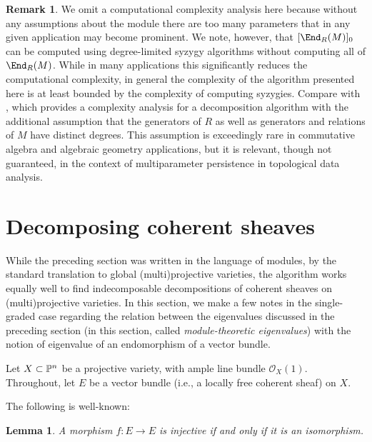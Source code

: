 \documentclass[12pt]{article}
\def\OO{\mathcal O}
\theoremstyle{theorem}
\numberwithin{thm}{section}
\newtheorem{lem}[thm]{Lemma}
\theoremstyle{definition}
\newtheorem{rem}[thm]{Remark}
\begin{document}
\begin{rem}
  We omit a computational complexity analysis here because without any assumptions about the module there are too many parameters that in any given application may become prominent. We note, however, that $[\End_R(M)]_0$ can be computed using degree-limited syzygy algorithms without computing all of $\End_R(M)$. While in many applications this significantly reduces the computational complexity, in general the complexity of the algorithm presented here is at least bounded by the complexity of computing syzygies. Compare with \cite{DX22}, which provides a complexity analysis for a decomposition algorithm with the additional assumption that the generators of $R$ as well as generators and relations of $M$ have distinct degrees. This assumption is exceedingly rare in commutative algebra and algebraic geometry applications, but it is relevant, though not guaranteed, in the context of multiparameter persistence in topological data analysis.
\end{rem}

\section{Decomposing coherent sheaves}
\label{sec:coherent}

While the preceding section was written in the language of modules, by the standard translation to global (multi)projective varieties, the algorithm works equally well to find indecomposable decompositions of coherent sheaves on (multi)projective varieties.
In this section, we make a few notes in the single-graded case regarding the relation between the eigenvalues discussed in the preceding section (in this section, called \emph{module-theoretic eigenvalues}) with the notion of eigenvalue of an endomorphism of a vector bundle.

Let $X\subset \P^n$ be a projective variety, with ample line bundle $\OO_X(1)$.
Throughout, let $E$ be a vector bundle (i.e., a locally free coherent sheaf) on $X$.

The following is well-known:

\begin{lem}{{\cite[Exercise~4.1]{Friedman98}}}
  A morphism $f:E\to E$ is injective if and only if it is an isomorphism.
\end{lem}

\end{document}

